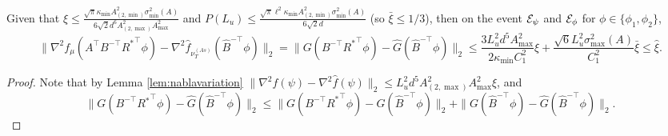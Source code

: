 \begin{lemma}
\label{lem:Binversenablavariation1}
Given that $\xi \le \frac{\sqrt{\pi}\kappa_{\min}A^2_{(2,\min)}\sigma_{\min}^2(A)}{6\sqrt{2}d^6A_{(2,\max)}^2A_{\max}^2}$ and $P(L_u) \le \frac{\sqrt{\pi}\ell^2\kappa_{\min}A^2_{(2,\min)}\sigma_{\min}^2(A)}{6\sqrt{2}d}$
(so $\bar{\xi} \le 1/3$), then on the event $\mathcal{E}_{\psi}$ and $\mathcal{E}_{\phi}$ for $\phi \in \{\phi_1, \phi_2\}$,
\[
\|\nabla^2 f_{\mu}(A^{\top}B^{-\top}{R^*}^{\top}\phi) - \nabla^2 \hat{f}_{\nu_T^{(As)}}(\hat{B}^{-\top}\phi)  \|_2 
= \|G(B^{-\top}{R^*}^{\top}\phi) - \hat{G}(\hat{B}^{-\top}\phi)\|_2
\le 
\frac{3L_u^2d^5A^2_{\max}}{2\kappa_{\min}C_1^2}\xi + \frac{\sqrt{6}L_u^2\sigma_{\max}^2(A)}{C_1^2}\bar{\xi}
\le \hat{\xi}.
\]
\end{lemma}
\begin{proof}
Note that by Lemma \ref{lem:nablavariation} $\|\nabla^2 f(\psi) - \nabla^2 \hat{f}(\psi)\|_2 \le L_u^2  d^5 A_{(2,\max)}^2A_{\max}^2\xi$, and 
\[
\|G(B^{-\top}R{^*}^{\top}\phi) - \hat{G}(\hat{B}^{-\top}\phi)\|_2
\le 
\|G(B^{-\top}{R^*}^{\top}\phi) - G(\hat{B}^{-\top}\phi)\|_2
+ \|G(\hat{B}^{-\top}\phi) - \hat{G}(\hat{B}^{-\top}\phi)\|_2.
\]


\end{proof}

